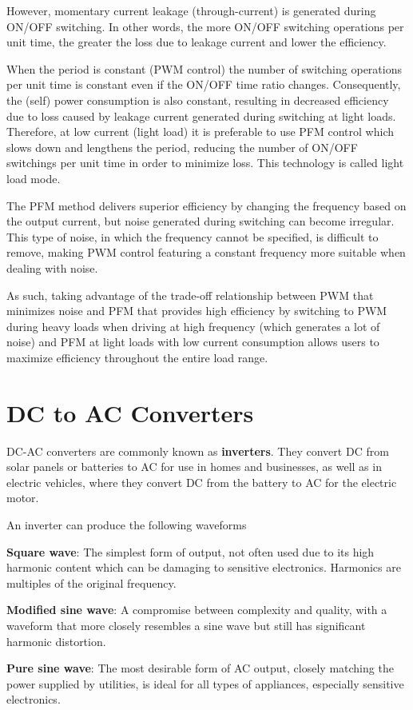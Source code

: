 \begin{enumerate}
    However, momentary current leakage (through-current) is generated during ON/OFF switching. In other words, the more ON/OFF switching operations per unit time, the greater the loss due to leakage current and lower the efficiency. 
    
    When the period is constant (PWM control) the number of switching operations per unit time is constant even if the ON/OFF time ratio changes. Consequently, the (self) power consumption is also constant, resulting in decreased efficiency due to loss caused by leakage current generated during switching at light loads. Therefore, at low current (light load) it is preferable to use PFM control which slows down and lengthens the period, reducing the number of ON/OFF switchings per unit time in order to minimize loss. This technology is called light load mode.

    The PFM method delivers superior efficiency by changing the frequency based on the output current, but noise generated during switching can become irregular. This type of noise, in which the frequency cannot be specified, is difficult to remove, making PWM control featuring a constant frequency more suitable when dealing with noise.

    As such, taking advantage of the trade-off relationship between PWM that minimizes noise and PFM that provides high efficiency by switching to PWM during heavy loads when driving at high frequency (which generates a lot of noise) and PFM at light loads with low current consumption allows users to maximize efficiency throughout the entire load range.
\end{enumerate}

\section{DC to AC Converters}
DC-AC converters are commonly known as \textbf{inverters}. They convert DC from solar panels or batteries to AC for use in homes and businesses, as well as in electric vehicles, where they convert DC from the battery to AC for the electric motor.

An inverter can produce the following waveforms
\begin{pline}
    \item \textbf{Square wave}: The simplest form of output, not often used due to its high harmonic content which can be damaging to sensitive electronics. Harmonics are multiples of the original frequency.
    \item \textbf{Modified sine wave}: A compromise between complexity and quality, with a waveform that more closely resembles a sine wave but still has significant harmonic distortion.
    \item \textbf{Pure sine wave}: The most desirable form of AC output, closely matching the power supplied by utilities, is ideal for all types of appliances, especially sensitive electronics.
\end{pline}

